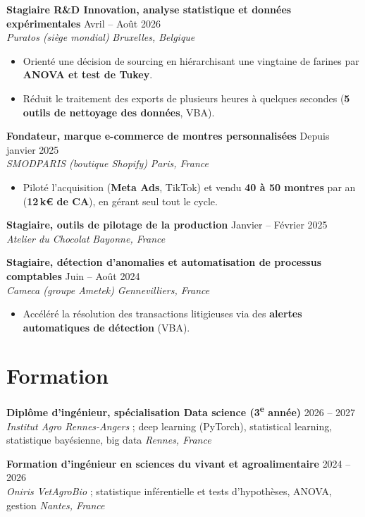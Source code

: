\documentclass[10pt,a4paper]{article}
\newcommand{\experience}[4]{%
  {\bfseries #1} \hfill {\small\color{soft} #2}\\
  {\itshape #3} \hfill {\small\itshape\color{soft} #4}\par
  \vspace{1pt}%
}
\newcommand{\formation}[4]{%
  {\bfseries #1} \hfill {\small\color{soft} #2}\\
  {\small #3} \hfill {\small\itshape\color{soft} #4}\par
  \vspace{2pt}%
}
\begin{document}
\experience{Stagiaire R\&D Innovation, analyse statistique et données expérimentales}{Avril -- Août 2026}
           {Puratos (siège mondial)}{Bruxelles, Belgique}
\begin{itemize}
  \item Orienté une décision de sourcing en hiérarchisant une vingtaine de farines par \textbf{ANOVA et test de Tukey}.
  \item Réduit le traitement des exports de plusieurs heures à quelques secondes (\textbf{5 outils de nettoyage des données}, VBA).
\end{itemize}
\vspace{2pt}

\experience{Fondateur, marque e-commerce de montres personnalisées}{Depuis janvier 2025}
           {SMODPARIS (boutique Shopify)}{Paris, France}
\begin{itemize}
  \item Piloté l'acquisition (\textbf{Meta Ads}, TikTok) et vendu \textbf{40 à 50 montres} par an (\textbf{12\,k€ de CA}), en gérant seul tout le cycle.
\end{itemize}
\vspace{2pt}

\experience{Stagiaire, outils de pilotage de la production}{Janvier -- Février 2025}
           {Atelier du Chocolat}{Bayonne, France}
\vspace{2pt}

\experience{Stagiaire, détection d'anomalies et automatisation de processus comptables}{Juin -- Août 2024}
           {Cameca (groupe Ametek)}{Gennevilliers, France}
\begin{itemize}
  \item Accéléré la résolution des transactions litigieuses via des \textbf{alertes automatiques de détection} (VBA).
\end{itemize}

\section{Formation}

\formation{Diplôme d'ingénieur, spécialisation Data science (3\textsuperscript{e} année)}{2026 -- 2027}
          {\textit{Institut Agro Rennes-Angers} ; deep learning (PyTorch), statistical learning, statistique bayésienne, big data}
          {Rennes, France}

\formation{Formation d'ingénieur en sciences du vivant et agroalimentaire}{2024 -- 2026}
          {\textit{Oniris VetAgroBio} ; statistique inférentielle et tests d'hypothèses, ANOVA, gestion}
          {Nantes, France}
\end{document}
